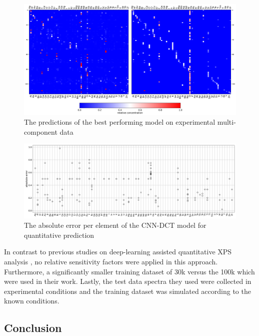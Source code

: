 \begin{figure}
    \centerline{
    \centering
    \includegraphics[width=1.2\textwidth]{Figures/cnn_dct_mae_32F_multi_best_model_pred.png}}
    \caption{The predictions of the best performing model on experimental multi-component data}
    \label{fig:multi_best_model}
\end{figure}

\begin{figure}
    \centerline{
    \centering
    \includegraphics[width=1.1\textwidth]{Figures/mae_per_element_best_perf_multi.png}}
    \caption{The absolute error per element of the CNN-DCT model for quantitative prediction}
    \label{fig:boxplot}
\end{figure}

In contrast to previous studies on deep-learning assisted quantitative XPS analysis \cite{drera_deep_2019}, no relative sensitivity factors were applied in this approach. Furthermore, a significantly smaller training dataset of 30k versus the 100k which were used in their work. Lastly, the test data spectra they used were collected in experimental conditions and the training dataset was simulated according to the known conditions.


\subsection{Conclusion}